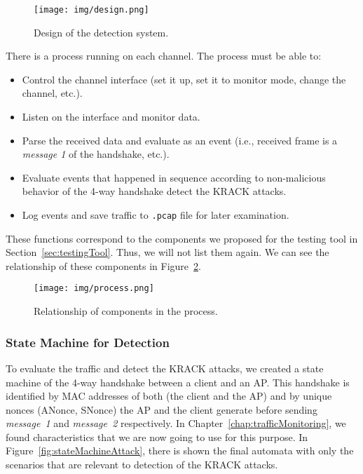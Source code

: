 \begin{figure}[h!]
  \centering
  \texttt{[image: img/design.png]}
  \caption[Design of the detection system]{Design of the detection system.}
  \label{fig:design}
\end{figure}

There is a process running on each channel. The process must be able to:

\begin{itemize}
    \item Control the channel interface (set it up, set it to monitor mode, change the channel, etc.).
    \item Listen on the interface and monitor data.
    \item Parse the received data and evaluate as an event (i.e., received frame is a \textit{message 1} of the handshake, etc.).
    \item Evaluate events that happened in sequence according to non-malicious behavior of the 4-way handshake detect the KRACK attacks.
    \item Log events and save traffic to \texttt{.pcap} file for later examination. 
\end{itemize}

These functions correspond to the components we proposed for the testing tool in Section~\ref{sec:testingTool}. Thus, we will not list them again. We can see the relationship of these components in Figure~\ref{fig:process}.

\begin{figure}[h!]
  \centering
  \texttt{[image: img/process.png]}
  \caption[Relationship of components in the process]{Relationship of components in the process.}
  \label{fig:process}
\end{figure}

\subsubsection*{State Machine for Detection}
To evaluate the traffic and detect the KRACK attacks, we created a state machine of the 4-way handshake between a client and an AP. This handshake is identified by MAC addresses of both (the client and the AP) and by unique nonces (ANonce, SNonce) the AP and the client generate before sending \textit{message~1} and \textit{message~2} respectively. In Chapter~\ref{chap:trafficMonitoring}, we found characteristics that we are now going to use for this purpose. In Figure~\ref{fig:stateMachineAttack}, there is shown the final automata with only the scenarios that are relevant to detection of the KRACK attacks.


